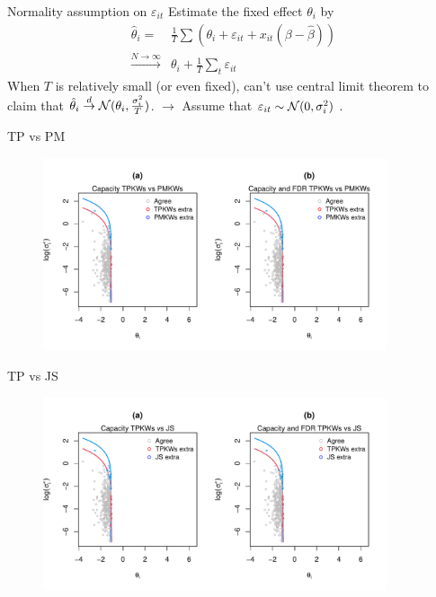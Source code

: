 \documentclass[10pt,mathserif,aspectratio=169]{beamer}
\begin{document}
\begin{frame}[label=normality]{Normality assumption on $\varepsilon_{it}$}
  Estimate the fixed effect $\theta_i$ by
  \begin{align*}
    \hat{\theta}_i =                       & \frac{1}{T}\sum(\theta_i+\varepsilon_{it}+x_{it}(\beta-\hat{\beta})) \\
    \overset{N\to \infty}{\longrightarrow} & \theta_i+\frac{1}{T}\sum_t \varepsilon_{it}
  \end{align*}
  When $T$ is relatively small (or even fixed), can't use central limit theorem to claim that $\hat{\theta}_i \overset{d}{\to} \mathcal{N}(\theta_i,\frac{\sigma_i^2}{T})$.
  $\longrightarrow$ Assume that $\varepsilon_{it} \sim \mathcal{N}(0,\sigma_i^2)$ .
  \hyperlink{observation}{}   \hyperlink{limitation}{}
\end{frame}

\begin{frame}[label=tpcontour]{TP vs PM}
  \begin{figure}
    \centering
    \includegraphics[width=0.9\textwidth]{../../Figures/2013-2022/GMM_m/GLmix/Contour_Left_0.2_0.2_TPKWs_PMKWs.pdf}
  \end{figure}
  \hyperlink{tpselect}{}
\end{frame}

\begin{frame}{TP vs JS}
  \begin{figure}
    \centering
    \includegraphics[width=0.9\textwidth]{../../Figures/2013-2022/GMM_m/GLmix/Contour_Left_0.2_0.2_TPKWs_JS.pdf}
  \end{figure}
\end{frame}
\end{document}
